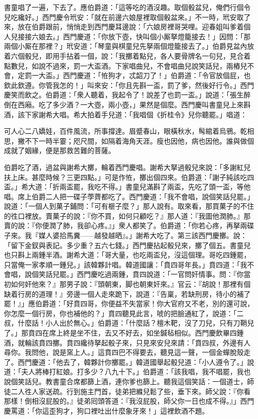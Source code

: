 書童唱了一遍，下去了。應伯爵道：「這等吃的酒沒趣。取個骰盆兒，俺們行個令兒吃纔好。」西門慶令玳安：「就在前邊六娘屋裡取個骰盆來。」不一時，玳安取了來，放在伯爵跟前，悄悄走到西門慶耳邊說：「六娘房裡哥哭哩。迎春姐叫爹着個人兒接接六娘去。」西門慶道：「你放下壺，快叫個小厮拏燈籠接去！」因問：「那兩個小厮在那裡？」玳安道：「琴童與棋童兒先拏兩個燈籠接去了。」伯爵見盆內放着六個骰兒，即用手拈着一個，說：「我擲着點兒，各人要骨牌名一句兒，見合着點數兒，如說不過來，罰一大盃酒。下家唱曲兒，不會唱曲兒說笑話兒，兩樁兒不會，定罰一大盃。」西門慶道：「恠狗才，忒韶刀了！」伯爵道：「令官放個屁，也欽此欽遵。你管我怎的！」叫來安：「你且先斟一盃，罰了爹，然後好行令。」西門慶笑而飲之。伯爵道：「衆人聽着，我起令了！說差了也罰一盃。」說道：「張生醉倒在西廂。吃了多少酒？一大壺，兩小壺，」果然是個麼。西門慶叫書童兒上來斟酒，該下家謝希大唱。希大拍着手兒道：「我唱個《折桂令》兒你聽罷。」唱道：

\begin{myquote} 
可人心二八嬌娃，百件風流，所事撐達。眉蹙春山，眼橫秋水，髩綰着烏鴉。乾相思，撇不下一時半霎；咫尺間，如隔着海角天涯。瘦也因他，病也因他。誰與做個成就了姻緣，便是那救苦難的菩薩。
\end{myquote} 

伯爵吃了酒，過盆與謝希大擲，輪着西門慶唱。謝希大拏過骰兒來說：「多謝紅兒扶上床。甚麼時候？三更四點。」可是作恠，擲出個四來。伯爵道：「謝子純該吃四盃。」希大道：「折兩盃罷，我吃不得。」書童兒滿斟了兩盃，先吃了頭一盃，等他唱。席上伯爵二人把一碟子荸薺都吃了。西門慶道：「我不會唱，說個笑話兒罷。」說道：「一個人到菓子鋪問：「可有榧子麼？」那人說有。取來看，那買菓子的不住的徃口裡放。賣菓子的說：『你不買，如何只顧吃？』那人道：『我圖他潤肺。』那賣的說：『你便潤了肺，我卻心疼。』」衆人都笑了。伯爵道：「你若心疼，再拏兩碟子來。我『媒人婆拾馬糞——越發越晒』。」{}謝希大吃了。第三該西門慶擲。說：「留下金釵與表記。多少重？五六七錢。」西門慶拈起骰兒來，擲了個五。書童兒也只斟上兩鍾半酒。謝希大道：「哥大量，也吃兩盃兒，沒這個理。哥吃四鍾罷，只當俺一家孝順一鍾兒。」該韓夥計唱。韓道國讓：「賁四哥年長。」賁四道：「我不會唱，說個笑話兒罷。」西門慶吃過兩鍾，賁四說道：「一官問奸情事。問：『你當初如何奸他來？』那男子說：『頭朝東，脚也朝東奸來。』官云：『胡說！那裡有個缺着行房的道理！』旁邊一個人走來跪下，說道：『告稟，若缺刑房，待小的補了罷！』」應伯爵道：「好賁四哥，你便益不失當家！你大官府又不老，別的還可說，你怎麼一個行房，你也補他的？」{}賁四聽見此言，唬的把臉通紅了，說道：「二叔，什麼話！小人出於無心。」伯爵道：「什麼話？檀木靶，沒了刀兒，只有刀鞘兒了。」{}那賁四在席上終是坐不住，去又不好去，如坐鍼毡相似。西門慶飲畢四鍾酒，就輪該賁四擲。賁四纔待拏起骰子來，只見來安兒來請：「賁四叔，外邊有人尋你。我問他，說是窯上人。」這賁四巴不得要去，聽見這一聲，一個金蟬脫殼走了。西門慶道：「他去了，韓夥計你擲罷。」韓道國舉起骰兒道：「小人遵令了。」說道：「夫人將棒打紅娘。打多少？八九十下。」伯爵道：「該我唱，我不唱罷，我也說個笑話兒。教書童合席都篩上酒，連你爹也篩上。聽我這個笑話：一個道士，師徒二人徃人家送疏。行到施主門首，徒弟把縧兒鬆了些，垂下來。師父說：『你看那樣！倒相沒屁股的。』徒弟囘頭答道：『我沒屁股，師父你一日也成不得。』」西門慶罵道：「你這歪狗才，狗口裡吐出什麼象牙來！」這裡飲酒不題。

